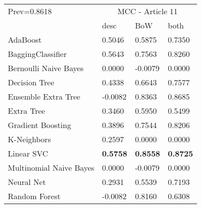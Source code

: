 \begin{tabular}{|l|l|l|l| }
\hline
Prev=0.8618 &  \multicolumn{3}{c|}{MCC - Article 11} \\
\cline{2-4} & desc & BoW & both \\ \hline
AdaBoost                & 0.5046 & 0.5875 & 0.7350\\
BaggingClassifier       & 0.5643 & 0.7563 & 0.8260\\
Bernoulli Naive Bayes   & 0.0000 & -0.0079 & 0.0000\\
Decision Tree           & 0.4338 & 0.6643 & 0.7577\\
Ensemble Extra Tree     & -0.0082 & 0.8363 & 0.8685\\
Extra Tree              & 0.3460 & 0.5950 & 0.5499\\
Gradient Boosting       & 0.3896 & 0.7544 & 0.8206\\
K-Neighbors             & 0.2597 & 0.0000 & 0.0000\\
Linear SVC              & {\bf 0.5758} & {\bf 0.8558} & {\bf 0.8725}\\
Multinomial Naive Bayes & 0.0000 & -0.0079 & 0.0000\\
Neural Net              & 0.2931 & 0.5539 & 0.7193\\
Random Forest           & -0.0082 & 0.8160 & 0.6308\\
\hline
\end{tabular}
